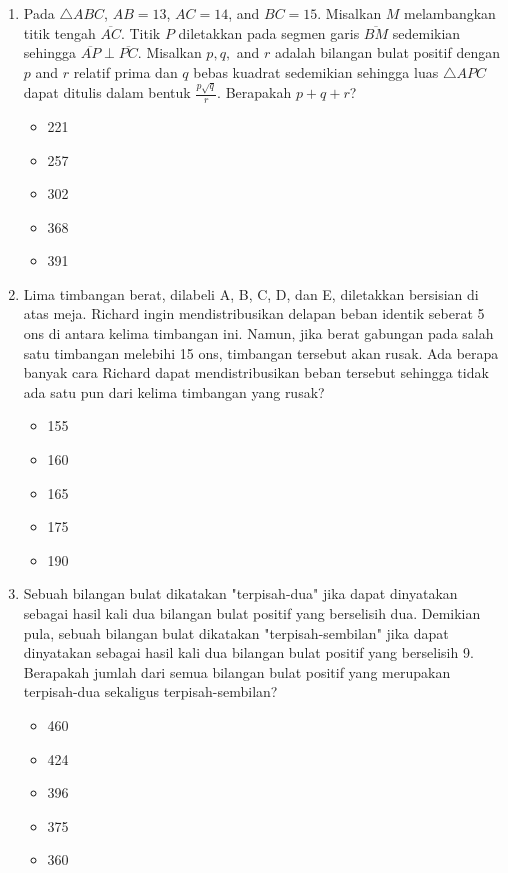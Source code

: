 \documentclass[11pt, a4paper]{scrartcl}
\begin{document}
\begin{enumerate}
    \item Pada $\triangle ABC$, $AB=13$, $AC=14$, and $BC=15$. Misalkan $M$ melambangkan titik tengah $\overline{AC}$. Titik $P$ diletakkan pada segmen garis $\overline{BM}$ sedemikian sehingga $\overline{AP}\perp\overline{PC}$. Misalkan $p, q,$ and $r$ adalah bilangan bulat positif dengan $p$ and $r$ relatif prima dan $q$ bebas kuadrat sedemikian sehingga luas $\triangle APC$ dapat ditulis dalam bentuk $\frac{p\sqrt{q}}{r}$. Berapakah $p+q+r$?
    \begin{itemize}
        \item[(A)] 221
        \item[(B)] 257
        \item[(C)] 302
        \item[(D)] 368
        \item[(E)] 391
    \end{itemize}

    \item Lima timbangan berat, dilabeli A, B, C, D, dan E, diletakkan bersisian di atas meja. Richard ingin mendistribusikan delapan beban identik seberat 5 ons di antara kelima timbangan ini. Namun, jika berat gabungan pada salah satu timbangan melebihi 15 ons, timbangan tersebut akan rusak. Ada berapa banyak cara Richard dapat mendistribusikan beban tersebut sehingga tidak ada satu pun dari kelima timbangan yang rusak?
    \begin{itemize}
        \item[(A)] 155
        \item[(B)] 160
        \item[(C)] 165
        \item[(D)] 175
        \item[(E)] 190
    \end{itemize}

    \item Sebuah bilangan bulat dikatakan "terpisah-dua" jika dapat dinyatakan sebagai hasil kali dua bilangan bulat positif yang berselisih dua. Demikian pula, sebuah bilangan bulat dikatakan "terpisah-sembilan" jika dapat dinyatakan sebagai hasil kali dua bilangan bulat positif yang berselisih 9. Berapakah jumlah dari semua bilangan bulat positif yang merupakan terpisah-dua sekaligus terpisah-sembilan?
    \begin{itemize}
        \item[(A)] 460
        \item[(B)] 424
        \item[(C)] 396
        \item[(D)] 375
        \item[(E)] 360
    \end{itemize}


\end{enumerate}
\end{document}

